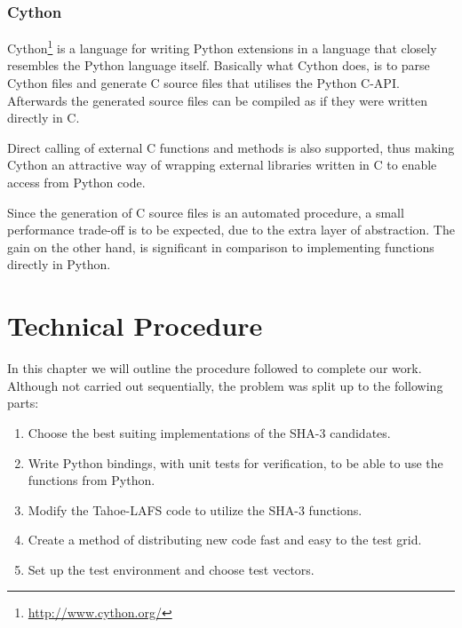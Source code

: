 \documentclass[english,12pt,a4paper]{book}
\begin{document}
\subsection{Cython}
Cython\footnote{\url{http://www.cython.org/}} is a language for writing Python
extensions in a language that closely resembles the Python language itself.
Basically what Cython does, is to parse Cython files and generate C source files
that utilises the Python C-API. Afterwards the generated source files can be
compiled as if they were written directly in C.

Direct calling of external C functions and methods is also supported, thus
making Cython an attractive way of wrapping external libraries written in C to
enable access from Python code.

Since the generation of C source files is an automated procedure, a small
performance trade-off is to be expected, due to the extra layer of abstraction.
The gain on the other hand, is significant in comparison to implementing
functions directly in Python.

\chapter{Technical Procedure}

%

In this chapter we will outline the procedure followed to complete our work.
Although not carried out sequentially, the problem was split up to the
following parts:

\begin{enumerate}
  \item Choose the best suiting implementations of the SHA-3 candidates.
  \item Write Python bindings, with unit tests for verification, to be able to
    use the functions from Python.
  \item Modify the Tahoe-LAFS code to utilize the SHA-3 functions.
  \item Create a method of distributing new code fast and easy to the test grid.
  \item Set up the test environment and choose test vectors.
\end{enumerate}
\end{document}
